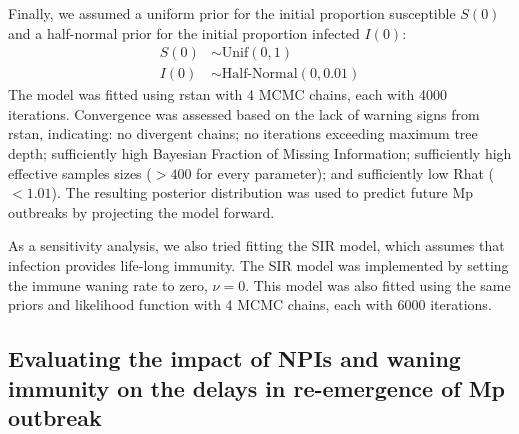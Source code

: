 \documentclass[12pt]{article}
\begin{document}
Finally, we assumed a uniform prior for the initial proportion susceptible $S(0)$ and a half-normal prior for the initial proportion infected $I(0)$:
\begin{align}
S(0) &\sim \mathrm{Unif}(0, 1)\\
I(0) &\sim \textrm{Half-Normal}(0, 0.01)
\end{align}
The model was fitted using rstan \citep{carpenter2017stan,rstan} with 4 MCMC chains, each with 4000 iterations.
Convergence was assessed based on the lack of warning signs from rstan, indicating: no divergent chains; no iterations exceeding maximum tree depth; sufficiently high Bayesian Fraction of Missing Information; sufficiently high effective samples sizes ($>400$ for every parameter); and sufficiently low Rhat ($<1.01$).
The resulting posterior distribution was used to predict future Mp outbreaks by projecting the model forward.

As a sensitivity analysis, we also tried fitting the SIR model, which assumes that infection provides life-long immunity.
The SIR model was implemented by setting the immune waning rate to zero, $\nu = 0$.
This model was also fitted using the same priors and likelihood function  with 4 MCMC chains, each with 6000 iterations.

\subsection{Evaluating the impact of NPIs and waning immunity on the delays in re-emergence of Mp outbreak}
\end{document}
